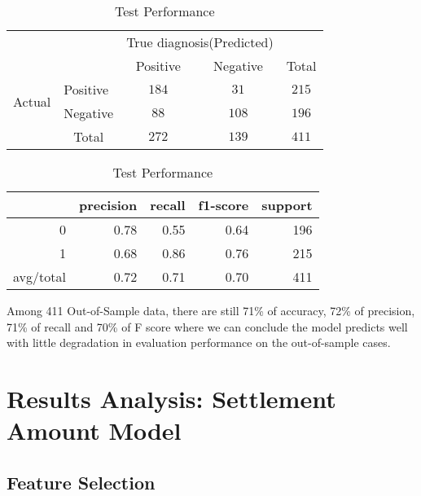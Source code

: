 \begin{table}[H]
\caption{Test Performance}
\centering
\begin{tabular}{l|l|c|c|c}
\multicolumn{2}{c}{}&\multicolumn{2}{c}{True diagnosis(Predicted)}&\\
\cline{3-4}
\multicolumn{2}{c|}{}&Positive&Negative&\multicolumn{1}{c}{Total}\\
\cline{2-4}
\multirow{2}{*}{Actual}& Positive & $184$ & $31$ & $215$\\
\cline{2-4}
& Negative & $88$ & $108$ & $196$\\
\cline{2-4}
\multicolumn{1}{c}{} & \multicolumn{1}{c}{Total} & \multicolumn{1}{c}{$272$} & \multicolumn{    1}{c}{$139$} & \multicolumn{1}{c}{$411$}\\
\end{tabular}
    \begin{tabular}{rrrrr}
         & precision & recall & f1-score & support \\
         \hline
     0 & 0.78   & 0.55     & 0.64  & 196 \\
     1 & 0.68     & 0.86  & 0.76    & 215 \\
    avg/total & 0.72   & 0.71   & 0.70  & 411 \\
    \bottomrule
    \end{tabular}
\end{table}
Among 411 Out-of-Sample data, there are still 71\% of accuracy, 72\% of precision, 71\% of recall and 70\% of F score where we can conclude the model predicts well with little degradation in evaluation performance on the out-of-sample cases. 


\section{Results Analysis: Settlement Amount Model}
\subsection{Feature Selection}

